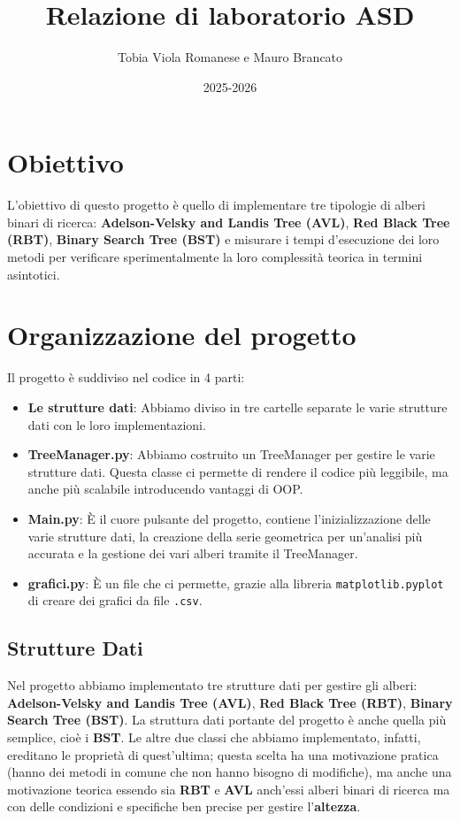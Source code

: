 \documentclass{article}
\title{Relazione di laboratorio ASD}
\author{Tobia Viola Romanese e Mauro Brancato}
\date{2025-2026}
\begin{document}
\maketitle







\tableofcontents
\clearpage

\section{Obiettivo}
L'obiettivo di questo progetto è quello di implementare tre tipologie di alberi binari di ricerca: \textbf{Adelson-Velsky and Landis Tree (AVL)}, \textbf{Red Black Tree (RBT)}, \textbf{Binary Search Tree (BST)} e misurare i tempi d'esecuzione
dei loro metodi per verificare sperimentalmente la loro complessità teorica in termini asintotici.
\section{Organizzazione del progetto}
Il progetto è suddiviso nel codice in 4 parti:
\begin{itemize}
    \item \textbf{Le strutture dati}: Abbiamo diviso in tre cartelle separate le varie strutture dati con le loro implementazioni.
    \item \textbf{TreeManager.py}: Abbiamo costruito un TreeManager per gestire le varie strutture dati. Questa classe ci permette di rendere il codice più leggibile, ma anche più scalabile introducendo vantaggi di OOP.
    \item \textbf{Main.py}: È il cuore pulsante del progetto, contiene l'inizializzazione delle varie strutture dati, la creazione della serie geometrica per un'analisi più accurata e la gestione dei vari alberi tramite il TreeManager.
    \item \textbf{grafici.py}: È un file che ci permette, grazie alla libreria \verb|matplotlib.pyplot| di creare dei grafici da file \verb|.csv|.
\end{itemize}
\subsection{Strutture Dati}
Nel progetto abbiamo implementato tre strutture dati per gestire gli alberi: \textbf{Adelson-Velsky and Landis Tree (AVL)}, \textbf{Red Black Tree (RBT)}, \textbf{Binary Search Tree (BST)}. La struttura dati portante del progetto è anche quella più semplice, cioè i \textbf{BST}. Le altre due classi che abbiamo implementato, infatti, ereditano le proprietà di quest'ultima; questa scelta ha una motivazione pratica (hanno dei metodi in comune che non hanno bisogno di modifiche), ma anche una motivazione teorica essendo sia \textbf{RBT} e \textbf{AVL} anch'essi alberi binari di ricerca ma con delle condizioni e specifiche ben precise per gestire l'\textbf{altezza}.
\end{document}
